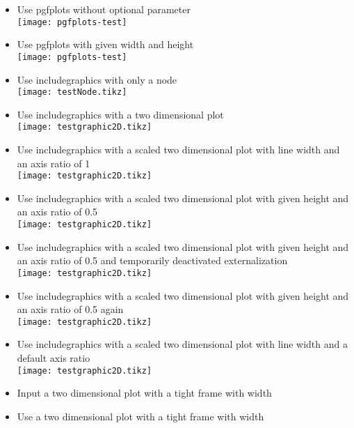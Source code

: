 \documentclass[twocolumn]{article}
\begin{document}
\begin{itemize}
		\item Use pgfplots without optional parameter\\%
			\texttt{[image: pgfplots-test]}%
		\item Use pgfplots with given width and height\\%
			\texttt{[image: pgfplots-test]}%
		\item Use includegraphics with only a node\\%
			\texttt{[image: testNode.tikz]}%
		\item Use includegraphics with a two dimensional plot\\%
			\texttt{[image: testgraphic2D.tikz]}%
		\item Use includegraphics with a scaled two dimensional plot with line width and an axis ratio of 1\\%
			\texttt{[image: testgraphic2D.tikz]}%
		\item Use includegraphics with a scaled two dimensional plot with given height and an axis ratio of 0.5\\%
			\texttt{[image: testgraphic2D.tikz]}%
		\item Use includegraphics with a scaled two dimensional plot with given height and an axis ratio of 0.5 and temporarily deactivated externalization\\%
			\tikzexternaldisable
			\texttt{[image: testgraphic2D.tikz]}%
			\tikzexternalenable
		\item Use includegraphics with a scaled two dimensional plot with given height and an axis ratio of 0.5 again\\%
			\texttt{[image: testgraphic2D.tikz]}%
		\item Use includegraphics with a scaled two dimensional plot with line width and a default axis ratio\\%
			\texttt{[image: testgraphic2D.tikz]}%
		\item Input a two dimensional plot with a tight frame with width \newlength{\mylen}\settowidth{\mylen}{\frame{}}\the\mylen\\%
			\frame{}
		\item Use a two dimensional plot with a tight frame with width \the\mylen\\%
	\end{itemize}
\end{document}
